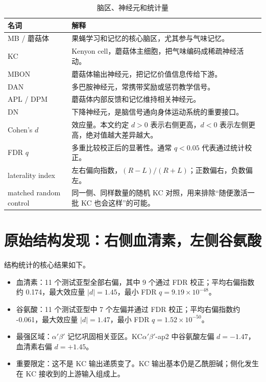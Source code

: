 \documentclass[11pt,fontset=none]{ctexart}
\begin{document}
\begin{table}[H]
\centering\small
\caption{脑区、神经元和统计量}
\begin{tabularx}{\linewidth}{@{}p{2.8cm}X@{}}
\toprule
\textbf{名词} & \textbf{解释} \\
\midrule
MB / 蘑菇体 & 果蝇学习和记忆的核心脑区，尤其参与气味记忆。\\
KC & Kenyon cell，蘑菇体主细胞，把气味编码成稀疏神经活动。\\
MBON & 蘑菇体输出神经元，把记忆价值信息传给下游。\\
DAN & 多巴胺神经元，常携带奖励或惩罚教学信号。\\
APL / DPM & 蘑菇体内部反馈和记忆维持相关神经元。\\
DN & 下降神经元，是脑信号通向身体运动系统的重要接口。\\
Cohen's $d$ & 效应量。本文约定 $d>0$ 表示右侧更高，$d<0$ 表示左侧更高，绝对值越大差异越大。\\
FDR $q$ & 多重比较校正后的显著性。通常 $q<0.05$ 代表通过统计校正。\\
laterality index & 左右偏向指数，$(R-L)/(R+L)$；正数偏右，负数偏左。\\
matched random control & 同一侧、同样数量的随机 KC 对照，用来排除“随便激活一批 KC 也会这样”的可能。\\
\bottomrule
\end{tabularx}
\end{table}

\section*{原始结构发现：右侧血清素，左侧谷氨酸}

结构统计的核心结果如下。

\begin{itemize}
  \item 血清素：11 个测试亚型全部右偏，其中 9 个通过 FDR 校正；平均右偏指数约 0.174，最大效应量 $|d|=1.45$，最小 FDR $q=9.19\times10^{-48}$。
  \item 谷氨酸：11 个测试亚型中 7 个左偏并通过 FDR 校正；平均右偏指数约 -0.061，最大效应量 $|d|=1.47$，最小 FDR $q=1.52\times10^{-50}$。
  \item 最强区域：$\alpha'\beta'$ 记忆巩固相关亚区。KC$\alpha'\beta'$-ap2 中谷氨酸左偏 $d=-1.47$，血清素右偏 $d=+1.45$。
  \item 重要限定：这不是 KC 输出递质变了。KC 输出基本仍是乙酰胆碱；侧化发生在 KC 接收到的上游输入组成上。
\end{itemize}
\end{document}
